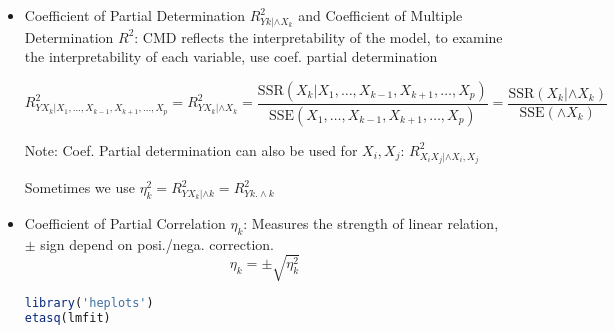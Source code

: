 \begin{itemize}[topsep=2pt,itemsep=2pt]
\item Coefficient of Partial Determination $ R^2_{Yk|\wedge X_k} $ and Coefficient of Multiple Determination $ R^2 $:
    CMD reflects the interpretability of the model, to examine the interpretability of each variable, use coef. partial determination

\begin{equation}
    R^2_{YX_k|X_1,\ldots,X_{k-1},X_{k+1},\ldots,X_p}=R^2_{YX_k|\wedge X_k}=\dfrac{\mathrm{SSR}(X_k|X_1,\ldots,X_{k-1},X_{k+1},\ldots,X_p) }{\mathrm{SSE}(X_1,\ldots,X_{k-1},X_{k+1},\ldots,X_p) }=\dfrac{\mathrm{SSR}(X_k|\wedge X_k) }{\mathrm{SSE}(\wedge X_k) }
\end{equation}

    Note: Coef. Partial determination can also be used for $ X_i,X_j $: $ R^2_{X_iX_j|\wedge X_i,X_j} $

    Sometimes we use $ \eta^2_k=R^2_{YX_k|\wedge k}=R^2_{Yk.\wedge k} $

    \item Coefficient of Partial Correlation $ \eta_k $: Measures the strength of linear relation, $ \pm $ sign depend on posi./nega. correction.
    \begin{equation}
        \eta_k=\pm \sqrt{\eta^2_k} 
    \end{equation}
    
    
\begin{rcode}
\begin{lstlisting}[language=R]
library('heplots')
etasq(lmfit)
\end{lstlisting}

\end{rcode}

\end{itemize}











